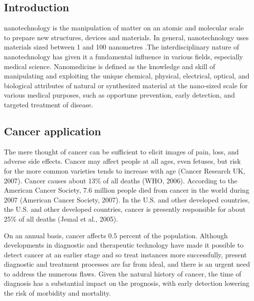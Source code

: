 \documentclass{article}
\begin{document}
\vspace{1 cm}

\begin{multicols}{2}
\section{Introduction}
nanotechnology is the manipulation of matter on an atomic and molecular scale to prepare new structures, devices and materials. In general, nanotechnology uses materials sized between 1 and 100 nanometres \cite{hong2009molecular}.The interdisciplinary nature of nanotechnology has given it a fundamental influence in various fields, especially medical science. Nanomedicine is defined as the knowledge and skill of manipulating and exploiting the unique chemical, physical, electrical, optical, and biological attributes of natural or synthesized material at the nano-sized scale for various medical purposes, such as opportune prevention, early detection, and targeted treatment of disease\cite{European,hong2009molecular,moghimi2005nanomedicine,pan2009nanomedicine,ting2010nanotargeted}.\subsection{Cancer application}The mere thought of cancer can be sufficient to elicit images of pain, loss, and
adverse side effects. Cancer may affect people at all ages, even fetuses, but risk for the more common varieties tends to increase with age (Cancer Research UK, 2007). Cancer causes about 13\% of all deaths (WHO, 2006). According to the American Cancer Society, 7.6 million people died from cancer in the world during 2007 (American Cancer Society, 2007). In the U.S. and other developed countries, the U.S. and other developed countries, cancer is presently responsible for about 25\% of all deaths (Jemal et al., 2005).

On an annual basis, cancer affects 0.5 percent of the population. Although developments in diagnostic and therapeutic technology have made it possible to detect cancer at an earlier stage and so treat instances more successfully, present diagnostic and treatment processes are far from ideal, and there is an urgent need to address the numerous flaws. Given the natural history of cancer, the time of diagnosis has a substantial impact on the prognosis, with early detection lowering the risk of morbidity and mortality.
\end{multicols}
\end{document}
